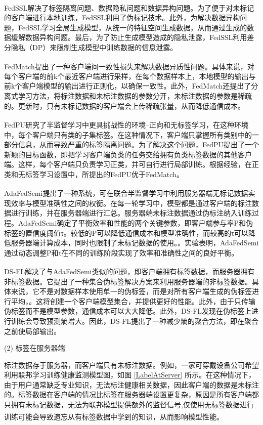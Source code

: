 FedSSL\textsuperscript{\cite{fan2022private}}解决了标签隔离问题、数据隐私问题和数据异构问题。为了便于对未标记的客户端进行本地训练，FedSSL利用了伪标记技术。此外，为解决数据异构问题，FedSSL学习全局生成模型，从统一的特征空间生成数据，从而通过生成的数据缓解数据异构问题。最后，为了防止生成模型造成的隐私泄露，FedSSL利用差分隐私（DP）来限制生成模型中训练数据的信息泄露。

FedMatch\textsuperscript{\cite{jeong2020federated}}提出了一种客户端间一致性损失来解决数据异质性问题。具体来说，对每个客户端的前k个最近客户端进行采样，在每个数据样本上，本地模型的输出与前k个客户端模型的输出进行正则化，以确保一致性。此外，FedMatch还提出了分离式学习方法，将标注数据和未标注数据的参数分开，未标注数据的参数是稀疏的。更新时，只有未标记数据的客户端会上传稀疏张量，从而降低通信成本。

FedPU\textsuperscript{\cite{lin2022federated}}研究了半监督学习中更具挑战性的环境--正向和无标签学习，在这种环境中，每个客户端只有类的子集标签。在这种情况下，客户端只掌握所有类别中的一部分信息，从而导致严重的标签隔离问题。为了解决这个问题，FedPU提出了一个新颖的目标函数，即把学习客户端负类的任务交给拥有负类标签数据的其他客户端。这样，每个客户端只负责学习正类，并可自行进行局部训练。根据经验，在正类和无标签学习设置中，所提出的FedPU优于FedMatch。

AdaFedSemi\textsuperscript{\cite{wang2022enhancing}}提出了一种系统，可在联合半监督学习中利用服务器端无标记数据实现效率与模型准确性之间的权衡。在每一轮学习中，模型都是通过客户端的标注数据进行训练，并在服务器端进行汇总。服务器端未标注数据通过伪标注纳入训练过程。AdaFedSemi确定了平衡效率和性能的两个关键参数，即客户端参与率P和伪标签的置信度阈值τ。较低的P可以降低通信成本和模型准确性，而较高的τ可以降低服务器端计算成本，同时也限制了未标记数据的使用。。实验表明，AdaFedSemi通过动态调整P和τ在不同的训练阶段实现了效率和准确性之间的良好平衡。

DS-FL\textsuperscript{\cite{itahara2021distillation}}解决了与AdaFedSemi类似的问题，即客户端拥有标签数据，而服务器拥有非标签数据。它提出了一种集合伪标签解决方案来利用服务器端的非标签数据。具体来说，它不是对数据样本使用单一的伪标签，而是对所有客户端生成的伪标签进行平均，。这将创建一个客户端模型集合，并提供更好的性能。此外，由于只传输伪标签而不是模型参数，通信成本可以大大降低。此外，DS-FL发现在伪标签上进行训练会导致预测熵增大。因此，DS-FL提出了一种减少熵的聚合方法，即在聚合之前使局部输出。

(2) 标签在服务器端

标注数据存于服务器，而客户端只有未标注数据。例如，一家可穿戴设备公司希望利用联邦学习训练健康监测模型图，如图 \ref{LabelAtServer} 所示。在这种情况下，由于用户通常缺乏专业知识，无法标注健康相关数据，因此客户端的数据是未标注的。标签数据在客户端的情况比标签在服务器端设置更复杂，原因是所有客户端都只拥有未标记数据，无法为联邦模型提供额外的监督信号,仅使用无标签数据进行训练可能会导致遗忘从有标签数据中学到的知识，从而影响模型性能\textsuperscript{\cite{jeong2020federated,diao2022semifl}}。

